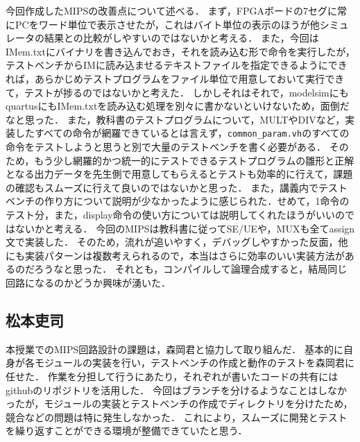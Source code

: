 \documentclass[dvipdfmx]{jsarticle}
\begin{document}
今回作成したMIPSの改善点について述べる．
まず，FPGAボードの7セグに常にPCをワード単位で表示させたが，これはバイト単位の表示のほうが他シミュレータの結果との比較がしやすいのではないかと考える．
また，今回はIMem.txtにバイナリを書き込んでおき，それを読み込む形で命令を実行したが，テストベンチからIMに読み込ませるテキストファイルを指定できるようにできれば，あらかじめテストプログラムをファイル単位で用意しておいて実行できて，テストが捗るのではないかと考えた．
しかしそれはそれで，modelsimにもquartusにもIMem.txtを読み込む処理を別々に書かないといけないため，面倒だなと思った．
また，教科書のテストプログラムについて，MULTやDIVなど，実装したすべての命令が網羅できているとは言えず，\texttt{common_param.vh}のすべての命令をテストしようと思うと別で大量のテストベンチを書く必要がある．
そのため，もう少し網羅的かつ統一的にテストできるテストプログラムの雛形と正解となる出力データを先生側で用意してもらえるとテストも効率的に行えて，課題の確認もスムーズに行えて良いのではないかと思った．
また，講義内でテストベンチの作り方について説明が少なかったように感じられた．せめて，1命令のテスト分，また，display命令の使い方については説明してくれたほうがいいのではないかと考える．
今回のMIPSは教科書に従ってSE/UEや，MUXも全てassign文で実装した．
そのため，流れが追いやすく，デバッグしやすかった反面，他にも実装パターンは複数考えられるので，本当はさらに効率のいい実装方法があるのだろうなと思った．
それとも，コンパイルして論理合成すると，結局同じ回路になるのかどうか興味が湧いた．

\subsection{松本吏司}
本授業でのMIPS回路設計の課題は，森岡君と協力して取り組んだ．
基本的に自身が各モジュールの実装を行い，テストベンチの作成と動作のテストを森岡君に任せた．
作業を分担して行うにあたり，それぞれが書いたコードの共有にはgithubのリポジトリを活用した．
今回はブランチを分けるようなことはしなかったが，モジュールの実装とテストベンチの作成でディレクトリを分けたため，競合などの問題は特に発生しなかった．
これにより，スムーズに開発とテストを繰り返すことができる環境が整備できていたと思う．
\end{document}

